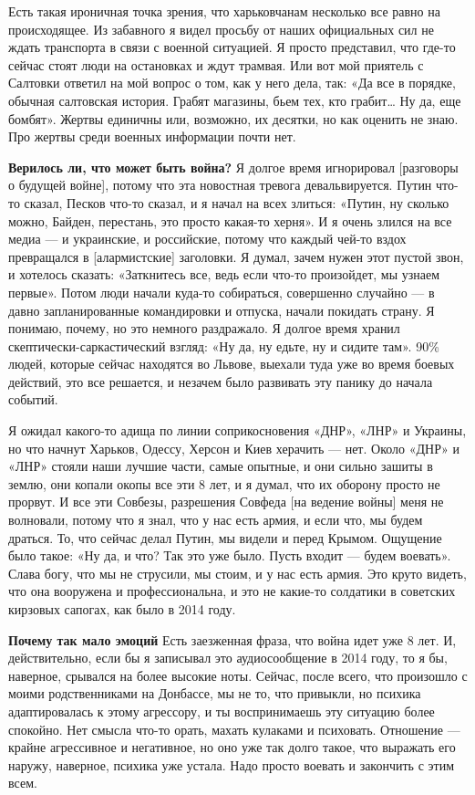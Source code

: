 Есть такая ироничная точка зрения, что харьковчанам несколько все равно на происходящее. Из забавного я видел просьбу от наших официальных сил не ждать транспорта в связи с военной ситуацией. Я просто представил, что где-то сейчас стоят люди на остановках и ждут трамвая. Или вот мой приятель с Салтовки ответил на мой вопрос о том, как у него дела, так: «Да все в порядке, обычная салтовская история. Грабят магазины, бьем тех, кто грабит… Ну да, еще бомбят». Жертвы единичны или, возможно, их десятки, но как оценить не знаю. Про жертвы среди военных информации почти нет.

\textbf{Верилось ли, что может быть война?}
Я долгое время игнорировал [разговоры о будущей войне], потому что эта новостная тревога девальвируется. Путин что-то сказал, Песков что-то сказал, и я начал на всех злиться: «Путин, ну сколько можно, Байден, перестань, это просто какая-то херня». И я очень злился на все медиа — и украинские, и российские, потому что каждый чей-то вздох превращался в [алармистские] заголовки. Я думал, зачем нужен этот пустой звон, и хотелось сказать: «Заткнитесь все, ведь если что-то произойдет, мы узнаем первые». Потом люди начали куда-то собираться, совершенно случайно — в давно запланированные командировки и отпуска, начали покидать страну. Я понимаю, почему, но это немного раздражало. Я долгое время хранил скептически-саркастический взгляд: «Ну да, ну едьте, ну и сидите там». 90\% людей, которые сейчас находятся во Львове, выехали туда уже во время боевых действий, это все решается, и незачем было развивать эту панику до начала событий.

Я ожидал какого-то адища по линии соприкосновения «ДНР», «ЛНР» и Украины, но что начнут Харьков, Одессу, Херсон и Киев херачить — нет. Около «ДНР» и «ЛНР» стояли наши лучшие части, самые опытные, и они сильно зашиты в землю, они копали окопы все эти 8 лет, и я думал, что их оборону просто не прорвут. И все эти Совбезы, разрешения Совфеда [на ведение войны] меня не волновали, потому что я знал, что у нас есть армия, и если что, мы будем драться. То, что сейчас делал Путин, мы видели и перед Крымом. Ощущение было такое: «Ну да, и что? Так это уже было. Пусть входит — будем воевать». Слава богу, что мы не струсили, мы стоим, и у нас есть армия. Это круто видеть, что она вооружена и профессиональна, и это не какие-то солдатики в советских кирзовых сапогах, как было в 2014 году.


\textbf{Почему так мало эмоций} Есть заезженная фраза, что война идет уже 8 лет. И, действительно, если бы я записывал это аудиосообщение в 2014 году, то я бы, наверное, срывался на более высокие ноты. Сейчас, после всего, что произошло с моими родственниками на Донбассе, мы не то, что привыкли, но психика адаптировалась к этому агрессору, и ты воспринимаешь эту ситуацию более спокойно. Нет смысла что-то орать, махать кулаками и психовать. Отношение — крайне агрессивное и негативное, но оно уже так долго такое, что выражать его наружу, наверное, психика уже устала. Надо просто воевать и закончить с этим всем.

